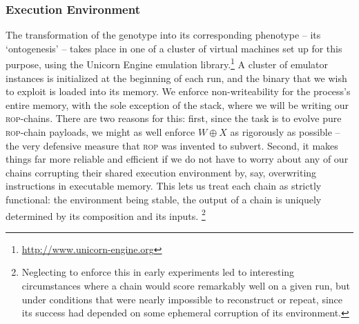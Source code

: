 \subsubsection{Execution Environment}
The transformation of the genotype into its corresponding
phenotype -- its `ontogenesis' -- takes place in one of a cluster
of virtual machines set up for this purpose, using the Unicorn Engine emulation library.\footnote{\url{http://www.unicorn-engine.org}} A cluster of
emulator instances is initialized at the beginning of each run,
and the binary that we wish to exploit is loaded into its memory.
We enforce non-writeability for the process's entire memory, with
the sole exception of the stack, where we will be writing our
\textsc{rop}-chains. There are two reasons for this: first, since
the task is to evolve pure \textsc{rop}-chain payloads, we might
as well enforce $W \oplus X$ as rigorously as possible -- the
very defensive measure that \textsc{rop} was invented to subvert.
Second, it makes things far more reliable and efficient if we
do not have to worry about any of our chains corrupting their
shared execution environment by, say, overwriting instructions in
executable memory. This lets us treat each chain as strictly
functional: the environment being stable, the output of a chain
is uniquely determined by its composition and its inputs.%
\footnote{Neglecting to enforce this in early experiments led to
  interesting circumstances where a chain would score remarkably
  well on a given run, but under conditions that were nearly
  impossible to reconstruct or repeat, since its success had
  depended on some ephemeral corruption of its environment.}


